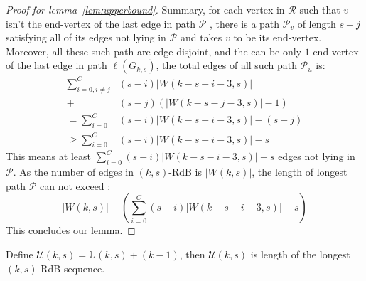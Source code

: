 \begin{proof}[Proof for lemma~\ref{lem:upperbound}]
    Summary, for each vertex in $\mathscr{R}$ such that $v$ isn't the end-vertex of the last edge in path $\mathscr{P}$ , there is a path $\mathcal{P}_{v}$ of length $s-j$ satisfying all of its edges not lying in $\mathscr{P}$ and takes $v$ to be its end-vertex. Moreover, all these such path are edge-disjoint, and the can be only $1$ end-vertex of the last edge in path $\ell(G_{k,s})$, the total edges of all such path $\mathcal{P}_{u}$ is:
    \begin{align*}
        \sum_{i=0,i\neq j}^{C} &(s-i)\lvert W(k-s-i-3,s) \rvert \\
        + &(s-j)(\lvert W(k-s-j-3,s)\rvert-1)\\
        = \sum_{i=0}^{C} &(s-i)\lvert W(k-s-i-3,s) \rvert - (s-j) \\
        \geq \sum_{i=0}^{C} &(s-i)\lvert W(k-s-i-3,s) \rvert -s  
    \end{align*}
    This means at least $\sum_{i=0}^{C} (s-i)\lvert W(k-s-i-3,s) \rvert -s$ edges not lying in $\mathscr{P}$. As the number of edges in $(k,s)$-RdB is $\lvert W(k,s)\rvert$, the length of longest path $\mathscr{P}$ can not exceed : 
    \[\lvert W(k,s)\rvert - (\sum_{i=0}^{C} (s-i)\lvert W(k-s-i-3,s) \rvert- s)\]
    This concludes our lemma.
\end{proof}

Define $\mathcal{U}(k,s) = \mathbb{U}(k,s)+(k-1)$, then $\mathcal{U}(k,s)$ is length of the longest $(k,s)$-RdB sequence.